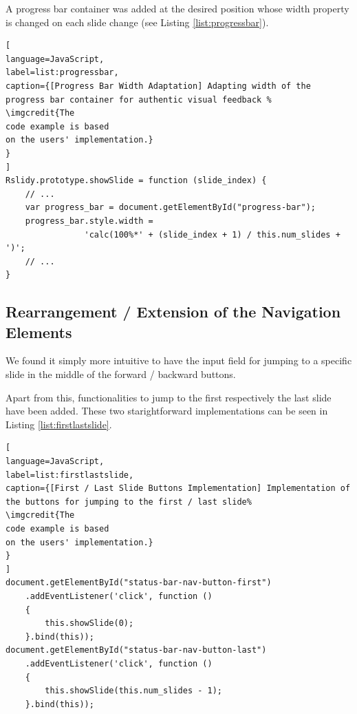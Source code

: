 A progress bar container was added at the desired position whose width property is changed on each slide change (see Listing \ref{list:progressbar}).


\begin{lstlisting}[
language=JavaScript,
label=list:progressbar,
caption={[Progress Bar Width Adaptation] Adapting width of the progress bar container for authentic visual feedback %
\imgcredit{The 
code example is based 
on the users' implementation.}
}
]
Rslidy.prototype.showSlide = function (slide_index) {
	// ...
	var progress_bar = document.getElementById("progress-bar");
	progress_bar.style.width =
				'calc(100%*' + (slide_index + 1) / this.num_slides + ')';
	// ...
}
\end{lstlisting}

\subsection{Rearrangement / Extension of the Navigation Elements}
We found it simply more intuitive to have the input field for jumping to a specific slide in the middle of the forward / backward buttons.

Apart from this, functionalities to jump to the first respectively the last slide have been added. These two starightforward implementations can be seen in Listing \ref{list:firstlastslide}.

\begin{minipage}{\linewidth}
\begin{lstlisting}[
language=JavaScript,
label=list:firstlastslide,
caption={[First / Last Slide Buttons Implementation] Implementation of the buttons for jumping to the first / last slide%
\imgcredit{The 
code example is based 
on the users' implementation.}
}
]
document.getElementById("status-bar-nav-button-first")
	.addEventListener('click', function ()
	{
		this.showSlide(0);
	}.bind(this));
document.getElementById("status-bar-nav-button-last")
	.addEventListener('click', function ()
	{
		this.showSlide(this.num_slides - 1);
	}.bind(this));
\end{lstlisting}
\end{minipage}



